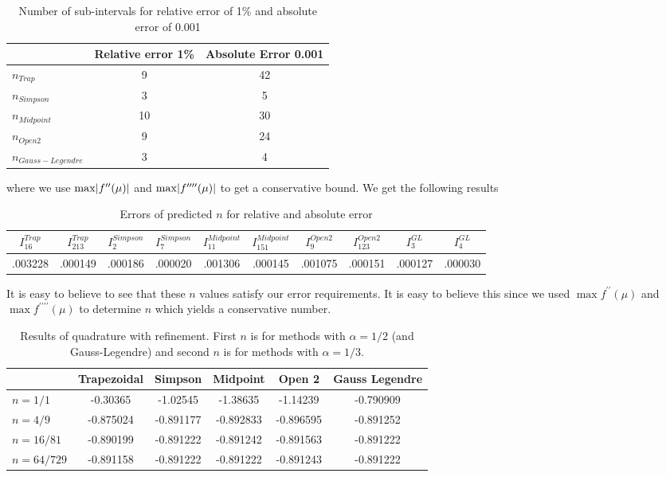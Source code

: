 \documentclass[12pt]{article}
\DeclarePairedDelimiter \abs{\lvert}{\rvert}%
\theoremstyle{remark}
\begin{document}
\begin{table}[H]
	\centering
	\begin{tabular}{||l|c|c||}
		\cline{2-3}
		\multicolumn{1}{c|}{} & Relative error 1\% & Absolute Error 0.001 \\ \hline \hline
		$n_{Trap}$ & 9	 & 42 \\ \hline
		$n_{Simpson}$ & 3 & 5 \\ \hline
		$n_{Midpoint}$ & 10 & 30 \\ \hline
		$n_{Open2}$ & 9 & 24 \\ \hline
		$n_{Gauss-Legendre}$ & 3 & 4 \\ \hline
	\end{tabular}
	\caption{Number of sub-intervals for relative error of 1\% and absolute error of 0.001}
\end{table}
where we use $\max \abs{f^{\prime\prime}(\mu)}$ and $\max \abs{f^{\prime\prime\prime\prime}(\mu)}$ to get a conservative bound. We get the following results 
\begin{table}[H]
	\centering
	\begin{tabular}{|c|c|c|c|c|c|c|c|c|c||}
		\hline
		 $I_{16}^{Trap}$ & $I_{213}^{Trap}$ & $I_{2}^{Simpson}$ & $I_{7}^{Simpson}$ & $I_{11}^{Midpoint}$ & $I_{151}^{Midpoint}$ & $I_{9}^{Open2}$ & $I_{123}^{Open2}$ & $I_3^{GL}$ & $I_4^{GL}$ \\ \hline \hline
		 .003228 & .000149 & .000186 & .000020 & .001306 & .000145 & .001075 & .000151 & .000127 & .000030 \\ \hline
	\end{tabular} 
	\caption{Errors of predicted $n$ for relative and absolute error}
\end{table}
It is easy to believe to see that these $n$ values satisfy our error requirements. It is easy to believe this since we used $\max f^{\prime\prime}(\mu)$ and $\max f^{\prime\prime\prime\prime}(\mu)$ to determine $n$ which yields a conservative number.
\begin{table}[H]
	\centering
	\begin{tabular}{||l|c|c|c|c|c||}
		\cline{2-6}
		\multicolumn{1}{c|}{} & Trapezoidal & Simpson & Midpoint & Open 2 & Gauss Legendre \\ \hline \hline
		$n=1/1$ & -0.30365 & -1.02545 & -1.38635 & -1.14239 & -0.790909 \\ \hline
		$n=4/9$ & -0.875024 & -0.891177 & -0.892833 & -0.896595 & -0.891252 \\ \hline
		$n=16/81$ & -0.890199 & -0.891222 & -0.891242 & -0.891563 & -0.891222 \\ \hline
		$n=64/729$ & -0.891158 & -0.891222 & -0.891222 & -0.891243 & -0.891222 \\ \hline
	\end{tabular}
	\caption{Results of quadrature with refinement. First $n$ is for methods with $\alpha = 1/2$ (and Gauss-Legendre) and second $n$ is for methods with $\alpha = 1/3$.}
\end{table}	
\end{document}
